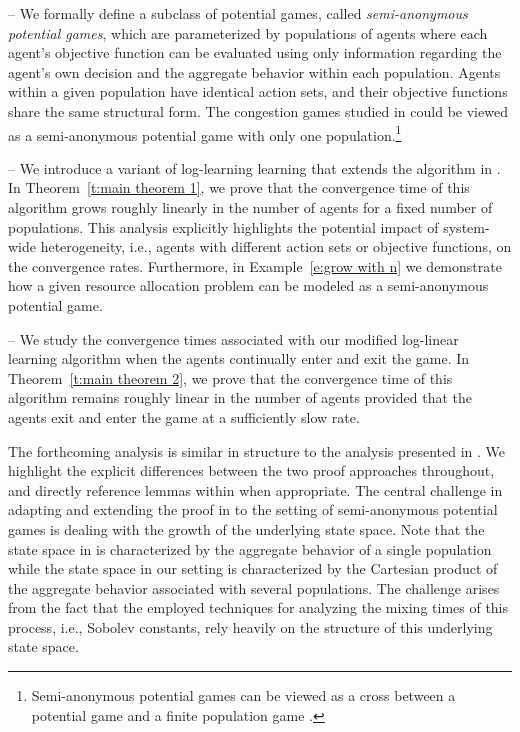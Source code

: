 \vspace{.1cm}
%
\noindent -- We formally define a subclass of potential games, called \emph{semi-anonymous potential games}, which are parameterized by populations of agents where each agent's objective function can be evaluated using only information regarding the agent's own decision and the aggregate behavior within each population.  Agents within a given population have identical action sets, and their objective functions share the same structural form.  The congestion games studied in \cite{Shah2010} could be viewed as a semi-anonymous potential game with only one population.\footnote{Semi-anonymous potential games can be viewed as a cross between a potential game and a finite population game \cite{Blume1996}.}

\vspace{.1cm}
%
\noindent -- We introduce a variant of log-learning learning that extends the algorithm in \cite{Shah2010}.  In Theorem~\ref{t:main theorem 1}, we prove that the convergence time of this algorithm grows roughly linearly in the number of agents for a fixed number of populations.  This analysis explicitly highlights the potential impact of system-wide heterogeneity, i.e., agents with different action sets or objective functions, on the convergence rates.  Furthermore, in Example~\ref{e:grow with n} we demonstrate how a given resource allocation problem can be modeled as a semi-anonymous potential game.  

\vspace{.1cm}
%
\noindent -- We study the convergence times associated with our modified log-linear learning algorithm when the agents continually enter and exit the game.  In Theorem~\ref{t:main theorem 2}, we prove that the convergence time of this algorithm remains roughly linear in the number of agents provided that the agents exit and enter the game at a sufficiently slow rate. 

The forthcoming analysis is similar in structure to the analysis presented in \cite{Shah2010}.  We highlight the explicit differences between the two proof approaches throughout, and directly reference lemmas within \cite{Shah2010} when appropriate.  The central challenge in adapting and extending the proof in \cite{Shah2010} to the setting of semi-anonymous potential games is dealing with the growth of the underlying state space.  Note that the state space in \cite{Shah2010} is characterized by the aggregate behavior of a single population while the state space in our setting is characterized by the Cartesian product of the aggregate behavior associated with several populations.  The challenge arises from the fact that the employed techniques for analyzing the mixing times of this process, i.e., Sobolev constants, rely heavily on the structure of this underlying state space.  




